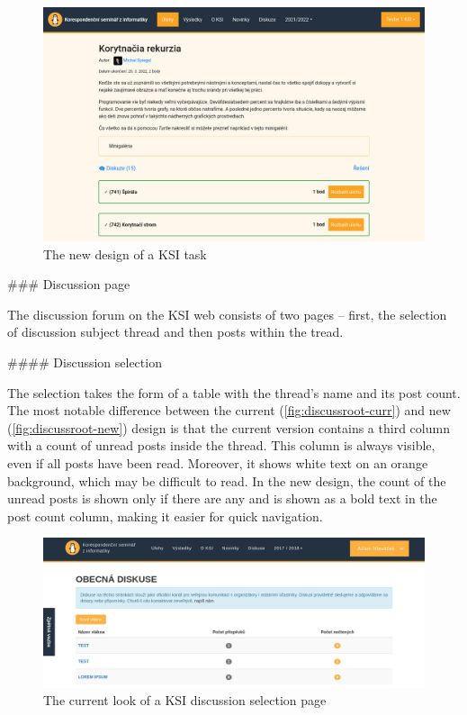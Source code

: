 \documentclass[
  digital, %
  oneside, %
  lof,     %
  nolot,     %
]{fithesis4}
\begin{document}
{\begin{figure}
\includegraphics[width=\textwidth]{assets/img/task-new}
\caption{The new design of a \acrshort{KSI} task}
\label{fig:task-new}
\end{figure}


### Discussion page

The discussion forum on the \acrshort{KSI} web consists of two pages -- first, the selection of discussion subject thread and then posts within the tread.

#### Discussion selection

The selection takes the form of a table with the thread's name and its post count. The most notable difference between the current (\autoref{fig:discussroot-curr}) and new (\autoref{fig:discussroot-new}) design is that the current version contains a third column with a count of unread posts inside the thread. This column is always visible, even if all posts have been read. Moreover, it shows white text on an orange background, which may be difficult to read. In the new design, the count of the unread posts is shown only if there are any and is shown as a bold text in the post count column, making it easier for quick navigation.

\begin{figure}
\includegraphics[width=\textwidth]{assets/img/discussionroot-curr}
\caption{The current look of a \acrshort{KSI} discussion selection page}
\label{fig:discussroot-curr}
\end{figure}

}
\end{document}
